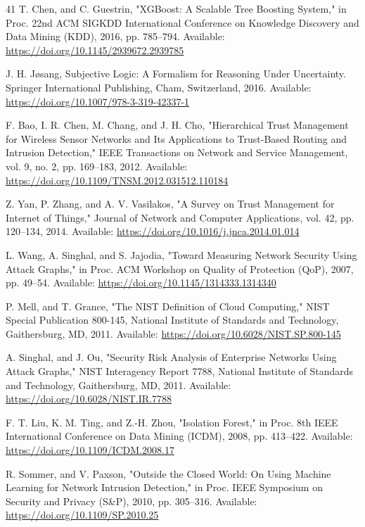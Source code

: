 \documentclass[journal,10pt,onecolumn]{IEEEtran}
\begin{document}
\begin{thebibliography}{41}
 T. Chen, and C. Guestrin, "XGBoost: A Scalable Tree Boosting System," in Proc. 22nd ACM SIGKDD International Conference on Knowledge Discovery and Data Mining (KDD), 2016, pp. 785–794. Available: \url{https://doi.org/10.1145/2939672.2939785}

 J. H. Jøsang, Subjective Logic: A Formalism for Reasoning Under Uncertainty. Springer International Publishing, Cham, Switzerland, 2016. Available: \url{https://doi.org/10.1007/978-3-319-42337-1}

 F. Bao, I. R. Chen, M. Chang, and J. H. Cho, "Hierarchical Trust Management for Wireless Sensor Networks and Its Applications to Trust-Based Routing and Intrusion Detection," IEEE Transactions on Network and Service Management, vol. 9, no. 2, pp. 169–183, 2012. Available: \url{https://doi.org/10.1109/TNSM.2012.031512.110184}

 Z. Yan, P. Zhang, and A. V. Vasilakos, "A Survey on Trust Management for Internet of Things," Journal of Network and Computer Applications, vol. 42, pp. 120–134, 2014. Available: \url{https://doi.org/10.1016/j.jnca.2014.01.014}

 L. Wang, A. Singhal, and S. Jajodia, "Toward Measuring Network Security Using Attack Graphs," in Proc. ACM Workshop on Quality of Protection (QoP), 2007, pp. 49–54. Available: \url{https://doi.org/10.1145/1314333.1314340}

 P. Mell, and T. Grance, "The NIST Definition of Cloud Computing," NIST Special Publication 800-145, National Institute of Standards and Technology, Gaithersburg, MD, 2011. Available: \url{https://doi.org/10.6028/NIST.SP.800-145}

 A. Singhal, and J. Ou, "Security Risk Analysis of Enterprise Networks Using Attack Graphs," NIST Interagency Report 7788, National Institute of Standards and Technology, Gaithersburg, MD, 2011. Available: \url{https://doi.org/10.6028/NIST.IR.7788}

 F. T. Liu, K. M. Ting, and Z.-H. Zhou, "Isolation Forest," in Proc. 8th IEEE International Conference on Data Mining (ICDM), 2008, pp. 413–422. Available: \url{https://doi.org/10.1109/ICDM.2008.17}

 R. Sommer, and V. Paxson, "Outside the Closed World: On Using Machine Learning for Network Intrusion Detection," in Proc. IEEE Symposium on Security and Privacy (S&P), 2010, pp. 305–316. Available: \url{https://doi.org/10.1109/SP.2010.25}


\end{thebibliography}
\end{document}
